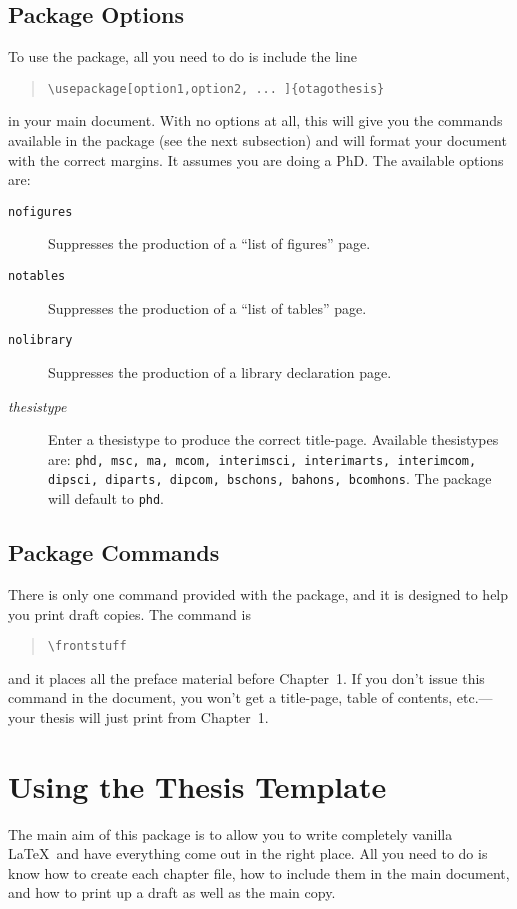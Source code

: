 \subsection{Package Options}
To use the package, all you need to do is include the line
\begin{quote}
\verb|\usepackage[option1,option2, ... ]{otagothesis}|
\end{quote}
in your main document.  With no options at all, this will give you
the commands available in the package (see the next subsection) and
will format your document with the correct margins.  It assumes you
are doing a PhD.
The available options are:
\begin{description}
\item[{\tt nofigures}] Suppresses the production of a ``list of figures''
page.
\item[{\tt notables}] Suppresses the production of a ``list of
tables'' page.
\item[\tt nolibrary] Suppresses the production of a library
  declaration page.
\item[{\em thesistype}] Enter a thesistype to produce the correct
title-page.  Available thesistypes are: {\tt phd, msc, ma, mcom,
interimsci, interimarts, interimcom, dipsci, diparts, dipcom, bschons,
bahons, bcomhons}.  The package will default to {\tt phd}.
\end{description}

\subsection{Package Commands}
There is only one command provided with the package, and it is
designed to help you print draft copies.  The command is
\begin{quote}
\verb|\frontstuff|
\end{quote}
and it places all the preface material before
Chapter~1.  If you don't issue this command in the document, you won't
get a title-page, table of contents, etc.---your thesis will just
print from Chapter~1.

\section{Using the Thesis Template}
The main aim of this package is to allow you to write completely
vanilla \LaTeX\ and have everything come out in the right place.  All
you need to do is know how to create each chapter file, how to include
them in the main document, and how to print up a draft as well as the
main copy.


